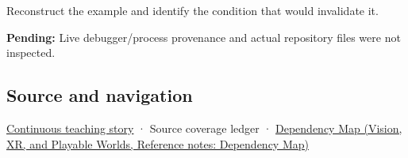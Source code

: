 Reconstruct the example and identify the condition that would invalidate it.

\textbf{Pending:} Live debugger/process provenance and actual repository files were not inspected.

\subsection{Source and navigation}\label{appendix-230b59c0676b-source-and-navigation}

\hyperref[01-foundations-i-ch002-bytes-become-a-durable-agreement]{Continuous teaching story} · {Source coverage ledger} · \href{../07-Vision-XR-and-Playable-Worlds/main.pdf\#nameddest=appendix-4ad47bdd269a}{Dependency Map (Vision, XR, and Playable Worlds, Reference notes: Dependency Map)}
